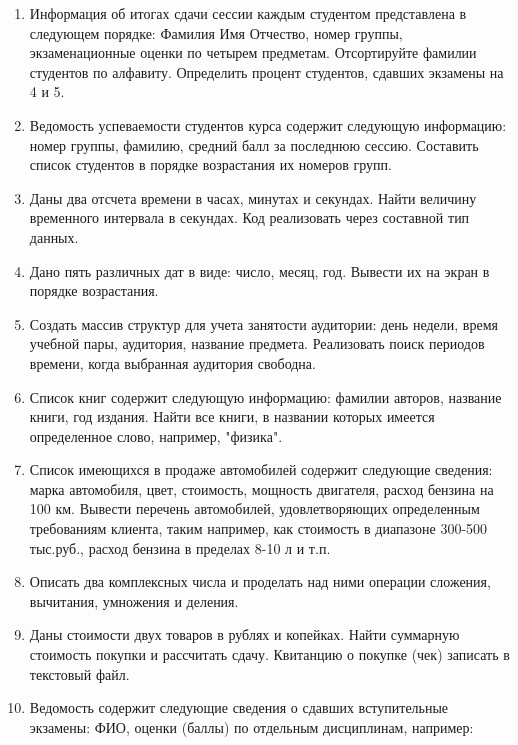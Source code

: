 \begin{enumerate}[leftmargin=*]
\begin{itemize}
        \end{itemize}
    \item Информация об итогах сдачи сессии каждым студентом представлена в следующем порядке: Фамилия Имя Отчество, номер группы, экзаменационные оценки по четырем предметам. 
    Отсортируйте фамилии студентов по алфавиту. Определить процент студентов, сдавших экзамены на 4 и 5.
    \item Ведомость успеваемости студентов курса содержит следующую информацию: номер группы, фамилию, средний балл за последнюю сессию. Составить список студентов в порядке возрастания их номеров групп.
    \item Даны два отсчета времени в часах, минутах и секундах. Найти величину временного интервала в секундах. Код реализовать через составной тип данных.
    \item Дано пять различных дат в виде: число, месяц, год. Вывести их на экран в порядке возрастания.
    \item Создать массив структур для учета занятости аудитории: день недели, время учебной пары, аудитория, название предмета. Реализовать поиск периодов времени, когда выбранная аудитория свободна.
    \item Список книг содержит следующую информацию: фамилии авторов, название книги, год издания. Найти все книги, в названии которых имеется определенное слово, например, "физика".
    \item Список имеющихся в продаже автомобилей содержит следующие сведения: марка автомобиля, цвет, стоимость, мощность двигателя, расход бензина на 100 км. Вывести перечень автомобилей, удовлетворяющих определенным требованиям клиента, таким например, как стоимость в диапазоне 300-500 тыс.руб., расход бензина в пределах 8-10 л и т.п.
    \item Описать два комплексных числа и проделать над ними операции сложения, вычитания, умножения и деления.
    \item Даны стоимости двух товаров в рублях и копейках. Найти суммарную стоимость покупки и рассчитать сдачу. Квитанцию о покупке (чек) записать в текстовый файл.
    \item Ведомость содержит следующие сведения о сдавших вступительные экзамены: ФИО, оценки (баллы) по отдельным дисциплинам, например:
    \begin{table}[H]
        \centering
        \renewcommand{\arraystretch}{1.5}
        \renewcommand{\tabcolsep}{1cm}
        \begin{tabular}{|c|c|c|c|}
            \hline

\end{tabular}
\end{table}
\end{enumerate}
